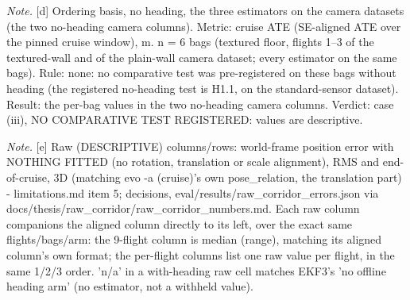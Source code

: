\begin{table}[htbp]
\textit{Note.} [d] Ordering basis, no heading, the three estimators on the camera datasets (the two no-heading camera columns). Metric: cruise ATE (SE-aligned ATE over the pinned cruise window), m. n = 6 bags (textured floor, flights 1--3 of the textured-wall and of the plain-wall camera dataset; every estimator on the same bags). Rule: none: no comparative test was pre-registered on these bags without heading (the registered no-heading test is H1.1, on the standard-sensor dataset). Result: the per-bag values in the two no-heading camera columns. Verdict: case (iii), NO COMPARATIVE TEST REGISTERED: values are descriptive.\par
\textit{Note.} [e] Raw (DESCRIPTIVE) columns/rows: world-frame position error with NOTHING FITTED (no rotation, translation or scale alignment), RMS and end-of-cruise, 3D (matching evo -a (cruise)'s own pose\_relation, the translation part) - limitations.md item 5; decisions, eval/results/raw\_corridor\_errors.json via docs/thesis/raw\_corridor/raw\_corridor\_numbers.md. Each raw column companions the aligned column directly to its left, over the exact same flights/bags/arm: the 9-flight column is median (range), matching its aligned column's own format; the per-flight columns list one raw value per flight, in the same 1/2/3 order. 'n/a' in a with-heading raw cell matches EKF3's 'no offline heading arm' (no estimator, not a withheld value).\par
\end{table}
